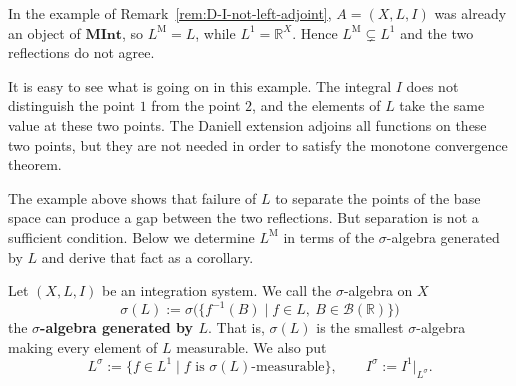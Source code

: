 \begin{example}
  In the example of Remark~\ref{rem:D-I-not-left-adjoint}, $A=(X,L,I)$ was
  already an object of $\mathbf{MInt}$, so $L^{\mathrm{M}}=L$, while
  $L^1=\mathbb{R}^X$.
  Hence $L^{\mathrm{M}}\subsetneq L^1$ and the two reflections do not agree.

  It is easy to see what is going on in this example.
  The integral $I$ does not distinguish the point $1$ from the point $2$, and the
  elements of $L$ take the same value at these two points.
  The Daniell extension adjoins all functions on these two points, but they are
  not needed in order to satisfy the monotone convergence theorem.
\end{example}

The example above shows that failure of $L$ to separate the points of the base
space can produce a gap between the two reflections.
But separation is not a sufficient condition.
Below we determine $L^{\mathrm{M}}$ in terms of the $\sigma$-algebra generated by
$L$ and derive that fact as a corollary.

\begin{definition}\label{def:sigma-L}
  Let $(X,L,I)$ be an integration system. We call the $\sigma$-algebra on $X$
  \[
    \sigma(L)
    :=\sigma\bigl(\{f^{-1}(B)\mid f\in L,\ B\in\mathcal{B}(\mathbb{R})\}\bigr)
  \]
  the \textbf{$\sigma$-algebra generated by $L$}.
  That is, $\sigma(L)$ is the smallest $\sigma$-algebra making every element of
  $L$ measurable.
  We also put
  \[
    L^{\sigma}:=\{f\in L^1\mid f\text{ is }\sigma(L)\text{-measurable}\},
    \qquad
    I^{\sigma}:=I^1|_{L^{\sigma}} .
  \]
\end{definition}

